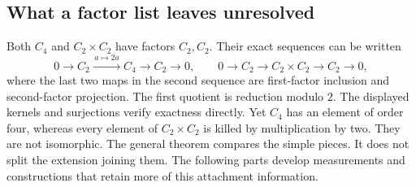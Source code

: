 \subsection{What a factor list leaves unresolved}\label{e:extensions}

Both $C_4$ and $C_2\times C_2$ have factors $C_2,C_2$. Their exact sequences
can be written
\[
0\longrightarrow C_2\xrightarrow{\,a\mapsto2a\,}C_4
\longrightarrow C_2\longrightarrow0,
\qquad
0\longrightarrow C_2\longrightarrow C_2\times C_2
\longrightarrow C_2\longrightarrow0,
\]
where the last two maps in the second sequence are first-factor inclusion
and second-factor projection. The first quotient is reduction modulo $2$.
The displayed kernels and surjections verify exactness directly.
Yet $C_4$ has an element of order four, whereas every element of
$C_2\times C_2$ is killed by multiplication by two. They are not isomorphic.
The general theorem compares the simple pieces. It does not split the
extension joining them. The following parts develop measurements and
constructions that retain more of this attachment information.
